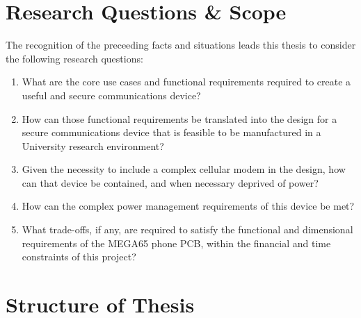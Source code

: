 
\section{Research Questions \& Scope}
The recognition of the preceeding facts and situations leads this thesis to consider the following research questions:
\begin{enumerate}
	\item What are the core use cases and functional requirements required to create a useful and secure communications device?\\
	\item How can those functional requirements be translated into the design for a secure communications device that is feasible to be manufactured in a University research environment?\\
	\item Given the necessity to include a complex cellular modem in the design, how can that device be contained, and when necessary deprived of power?\\
	\item How can the complex power management requirements of this device be met?\\
	\item What trade-offs, if any, are required to satisfy the functional and dimensional requirements of the MEGA65 phone PCB, within the financial and time constraints of this project?\\
\end{enumerate}

\section{Structure of Thesis}

